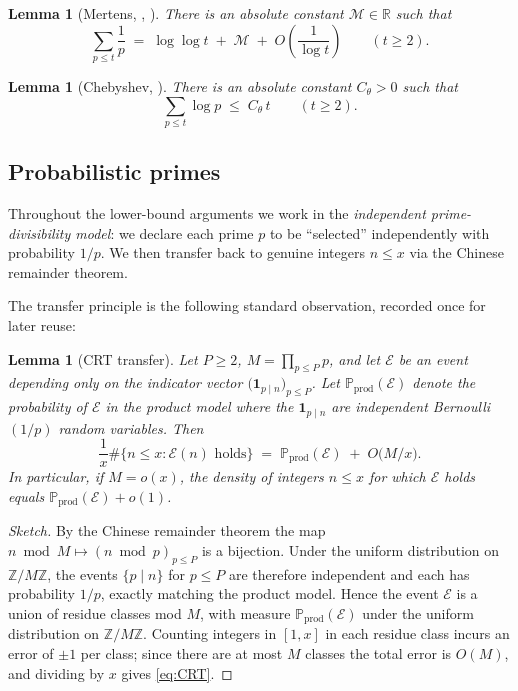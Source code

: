 \documentclass[11pt,reqno]{amsart}
\theoremstyle{plain}
\newtheorem{lemma}[theorem]{Lemma}
\theoremstyle{definition}
\newcommand{\ZZ}{\mathbb{Z}}
\newcommand{\RR}{\mathbb{R}}
\newcommand{\PP}{\mathbb{P}}
\begin{document}
\begin{lemma}[Mertens, {\cite[Thm.~427]{HardyWright}, \cite{Mertens-orig}}]\label{lem:Mertens}
There is an absolute constant $\mathcal{M}\in\RR$ such that
\begin{equation}\label{eq:Mertens}
\sum_{p\le t} \frac{1}{p} \;=\; \log\log t \;+\; \mathcal{M} \;+\; O\!\left(\frac{1}{\log t}\right)
\qquad (t\ge 2).
\end{equation}
\end{lemma}

\begin{lemma}[Chebyshev, {\cite[Thm.~414]{HardyWright}}]\label{lem:Cheb}
There is an absolute constant $C_{\theta}>0$ such that
\begin{equation}\label{eq:Cheb}
\sum_{p\le t} \log p \;\le\; C_{\theta}\, t \qquad (t\ge 2).
\end{equation}
\end{lemma}

\subsection{Probabilistic primes}\label{ss:prob-model}

Throughout the lower-bound arguments we work in the
\emph{independent prime-divisibility model}: we declare each prime $p$ to be
``selected'' independently with probability $1/p$. We then transfer back to
genuine integers $n\le x$ via the Chinese remainder theorem.

The transfer principle is the following standard observation, recorded once for
later reuse:

\begin{lemma}[CRT transfer]\label{lem:CRT}
Let $P\ge 2$, $M=\prod_{p\le P}p$, and let $\mathcal{E}$ be an event depending
only on the indicator vector $\bigl(\mathbf{1}_{p\mid n}\bigr)_{p\le P}$. Let
$\PP_{\mathrm{prod}}(\mathcal{E})$ denote the probability of $\mathcal{E}$ in
the product model where the $\mathbf{1}_{p\mid n}$ are independent
Bernoulli$(1/p)$ random variables. Then
\begin{equation}\label{eq:CRT}
\frac{1}{x}\#\{n\le x : \mathcal{E}(n) \text{ holds}\} \;=\; \PP_{\mathrm{prod}}(\mathcal{E})\;+\;O\!\bigl(M/x\bigr).
\end{equation}
In particular, if $M=o(x)$, the density of integers $n\le x$ for which
$\mathcal{E}$ holds equals $\PP_{\mathrm{prod}}(\mathcal{E})+o(1)$.
\end{lemma}

\begin{proof}[Sketch]
By the Chinese remainder theorem the map $n\bmod M\mapsto (n\bmod p)_{p\le P}$
is a bijection. Under the uniform distribution on $\ZZ/M\ZZ$, the events
$\{p\mid n\}$ for $p\le P$ are therefore independent and each has probability
$1/p$, exactly matching the product model. Hence the event $\mathcal{E}$ is a
union of residue classes mod $M$, with measure
$\PP_{\mathrm{prod}}(\mathcal{E})$ under the uniform distribution on $\ZZ/M\ZZ$.
Counting integers in $[1,x]$ in each residue class incurs an error of $\pm 1$
per class; since there are at most $M$ classes the total error is $O(M)$, and
dividing by $x$ gives \eqref{eq:CRT}.
\end{proof}
\end{document}
